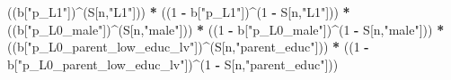 \documentclass[
]{book}
\newenvironment{Shaded}{\begin{snugshade}}{\end{snugshade}}
\newcommand{\DecValTok}[1]{\textcolor[rgb]{0.00,0.00,0.81}{#1}}
\newcommand{\NormalTok}[1]{#1}
\newcommand{\SpecialCharTok}[1]{\textcolor[rgb]{0.81,0.36,0.00}{\textbf{#1}}}
\newcommand{\StringTok}[1]{\textcolor[rgb]{0.31,0.60,0.02}{#1}}
\begin{document}
\begin{Shaded}
\begin{Highlighting}[]
\NormalTok{      ((b[}\StringTok{"p\_L1"}\NormalTok{])}\SpecialCharTok{\^{}}\NormalTok{(S[n,}\StringTok{"L1"}\NormalTok{])) }\SpecialCharTok{*}
\NormalTok{      ((}\DecValTok{1} \SpecialCharTok{{-}}\NormalTok{ b[}\StringTok{"p\_L1"}\NormalTok{])}\SpecialCharTok{\^{}}\NormalTok{(}\DecValTok{1} \SpecialCharTok{{-}}\NormalTok{ S[n,}\StringTok{"L1"}\NormalTok{])) }\SpecialCharTok{*}
\NormalTok{      ((b[}\StringTok{"p\_L0\_male"}\NormalTok{])}\SpecialCharTok{\^{}}\NormalTok{(S[n,}\StringTok{"male"}\NormalTok{])) }\SpecialCharTok{*} 
\NormalTok{      ((}\DecValTok{1} \SpecialCharTok{{-}}\NormalTok{ b[}\StringTok{"p\_L0\_male"}\NormalTok{])}\SpecialCharTok{\^{}}\NormalTok{(}\DecValTok{1} \SpecialCharTok{{-}}\NormalTok{ S[n,}\StringTok{"male"}\NormalTok{])) }\SpecialCharTok{*} 
\NormalTok{      ((b[}\StringTok{"p\_L0\_parent\_low\_educ\_lv"}\NormalTok{])}\SpecialCharTok{\^{}}\NormalTok{(S[n,}\StringTok{"parent\_educ"}\NormalTok{])) }\SpecialCharTok{*}
\NormalTok{      ((}\DecValTok{1} \SpecialCharTok{{-}}\NormalTok{ b[}\StringTok{"p\_L0\_parent\_low\_educ\_lv"}\NormalTok{])}\SpecialCharTok{\^{}}\NormalTok{(}\DecValTok{1} \SpecialCharTok{{-}}\NormalTok{ S[n,}\StringTok{"parent\_educ"}\NormalTok{])) }
    

\end{Highlighting}
\end{Shaded}
\end{document}
